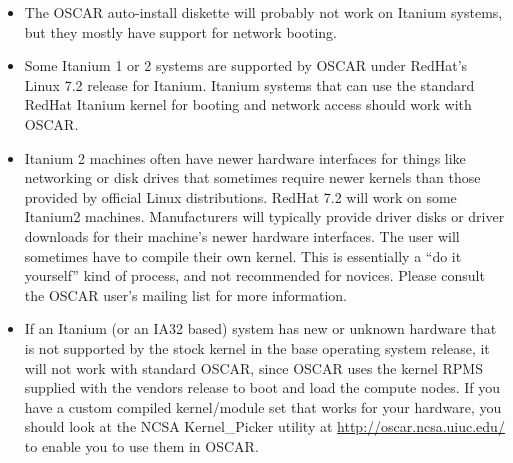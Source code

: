 \begin{itemize}

\item The OSCAR auto-install diskette will probably not work on Itanium
  systems, but they mostly have support for network booting.
  
\item Some Itanium 1 or 2 systems are supported by OSCAR under
  RedHat's Linux 7.2 release for Itanium.  Itanium systems that can
  use the standard RedHat Itanium kernel for booting and network
  access should work with OSCAR.

\item Itanium 2 machines often have newer hardware interfaces for
	things like networking or disk drives that sometimes require newer
	kernels than those provided by official Linux distributions. RedHat 7.2
	will work on some Itanium2 machines. Manufacturers will typically
	provide driver disks or driver downloads for their machine's newer
	hardware interfaces. The user will sometimes have to compile their own
	kernel.  This is essentially a ``do it yourself'' kind
    of process, and not recommended for novices.  Please consult the
    OSCAR user's mailing list for more information.

\item If an Itanium (or an IA32 based) system has new or unknown
  hardware that is not supported by the stock kernel in the base
  operating system release, it will not work with standard OSCAR,
  since OSCAR uses the kernel RPMS supplied with the vendors release
  to boot and load the compute nodes.  If you have a custom compiled
  kernel/module set that works for your hardware, you should look at
  the NCSA Kernel\_Picker utility at \url{http://oscar.ncsa.uiuc.edu/} to
  enable you to use them in OSCAR.

\end{itemize}


